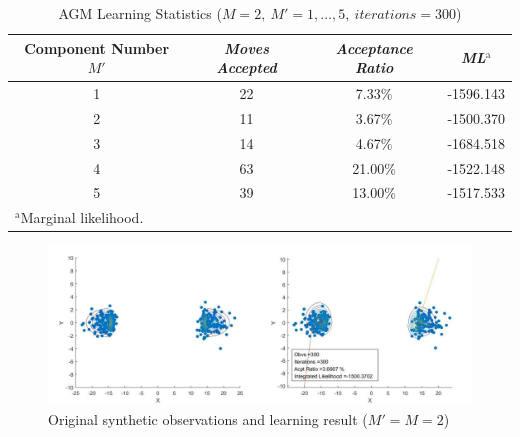 \documentclass[conference]{llncs}
\begin{document}
 
\begin{table}[h]
\caption{AGM Learning Statistics ($M = 2,\ M' = 1,\dots,5,\ iterations = 300$)}
\begin{center}
\begin{tabular}{|c|c|c|c|}
\hline
\multicolumn{1}{|p{2cm}|}{\centering \textbf{Component Number $M'$}} & \multicolumn{1}{|p{2cm}|}{\centering \textbf{\textit{Moves Accepted}}} & \multicolumn{1}{|p{2cm}|}{\centering \textbf{\textit{Acceptance Ratio}}} & \textbf{\textit{ML$^{\mathrm{a}}$}}\\
\hline
1 & 22 & 7.33\% & -1596.143  \\
2 & 11 & 3.67\% & -1500.370 \\
3 & 14 & 4.67\% & -1684.518 \\
4 & 63 & 21.00\% & -1522.148 \\
5 & 39 & 13.00\% & -1517.533 \\
\hline
\multicolumn{4}{l}{$^{\mathrm{a}}$Marginal likelihood.}
\end{tabular}
\label{tab1}
\end{center}
\end{table}

\begin{figure}
\centering
\includegraphics[width=0.6\paperwidth ]{02.jpg}
\caption{Original synthetic observations and learning result ($M' = M = 2$)}
\label{fig:1}
\end{figure}
\end{document}
